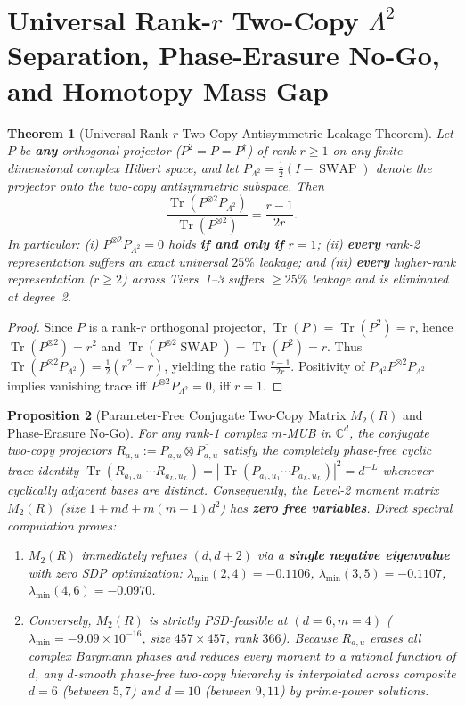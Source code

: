 \documentclass[11pt,a4paper]{article}
\newtheorem{theorem}{Theorem}[section]
\newtheorem{proposition}[theorem]{Proposition}
\theoremstyle{definition}
\newcommand{\C}{\mathbb{C}}
\newcommand{\Tr}{\operatorname{Tr}}
\newcommand{\SWAP}{\operatorname{SWAP}}
\begin{document}
\section{Universal Rank-$r$ Two-Copy $\Lambda^2$ Separation, Phase-Erasure No-Go, and Homotopy Mass Gap}
\label{sec:2copy}

\begin{theorem}[Universal Rank-$r$ Two-Copy Antisymmetric Leakage Theorem]
\label{thm:lambda2}
Let $P$ be \textbf{any} orthogonal projector ($P^2 = P = P^\dagger$) of rank $r \ge 1$ on any finite-dimensional complex Hilbert space, and let $P_{\Lambda^2} = \frac{1}{2}(I - \SWAP)$ denote the projector onto the two-copy antisymmetric subspace. Then
\[
  \frac{\Tr(P^{\otimes 2} P_{\Lambda^2})}{\Tr(P^{\otimes 2})} = \frac{r - 1}{2r}.
\]
In particular: (i) $P^{\otimes 2} P_{\Lambda^2} = 0$ holds \textbf{if and only if} $r = 1$; (ii) \textbf{every} rank-2 representation suffers an exact universal $25\%$ leakage; and (iii) \textbf{every} higher-rank representation ($r \ge 2$) across Tiers~1--3 suffers $\ge 25\%$ leakage and is eliminated at degree~2.
\end{theorem}

\begin{proof}
Since $P$ is a rank-$r$ orthogonal projector, $\Tr(P) = \Tr(P^2) = r$, hence $\Tr(P^{\otimes 2}) = r^2$ and $\Tr(P^{\otimes 2} \SWAP) = \Tr(P^2) = r$. Thus $\Tr(P^{\otimes 2} P_{\Lambda^2}) = \frac{1}{2}(r^2 - r)$, yielding the ratio $\frac{r-1}{2r}$. Positivity of $P_{\Lambda^2} P^{\otimes 2} P_{\Lambda^2}$ implies vanishing trace iff $P^{\otimes 2} P_{\Lambda^2} = 0$, iff $r = 1$.
\end{proof}

\begin{proposition}[Parameter-Free Conjugate Two-Copy Matrix $M_2(R)$ and Phase-Erasure No-Go]
\label{prop:2copy-nogo}
For any rank-1 complex $m$-MUB in $\C^d$, the conjugate two-copy projectors $R_{a,u} := P_{a,u} \otimes \overline{P_{a,u}}$ satisfy the completely phase-free cyclic trace identity $\Tr(R_{a_1,u_1} \cdots R_{a_L,u_L}) = |\Tr(P_{a_1,u_1}\cdots P_{a_L,u_L})|^2 = d^{-L}$ whenever cyclically adjacent bases are distinct. Consequently, the Level-2 moment matrix $M_2(R)$ (size $1 + md + m(m-1)d^2$) has \textbf{zero free variables}. Direct spectral computation proves:
\begin{enumerate}
  \item $M_2(R)$ immediately refutes $(d, d+2)$ via a \textbf{single negative eigenvalue} with zero SDP optimization: $\lambda_{\min}(2,4) = -0.1106$, $\lambda_{\min}(3,5) = -0.1107$, $\lambda_{\min}(4,6) = -0.0970$.
  \item Conversely, $M_2(R)$ is strictly PSD-feasible at $(d=6, m=4)$ ($\lambda_{\min} = -9.09 \times 10^{-16}$, size $457 \times 457$, rank $366$). Because $R_{a,u}$ erases all complex Bargmann phases and reduces every moment to a rational function of $d$, any $d$-smooth phase-free two-copy hierarchy is interpolated across composite $d=6$ (between $5,7$) and $d=10$ (between $9,11$) by prime-power solutions.
\end{enumerate}
\end{proposition}
\end{document}
